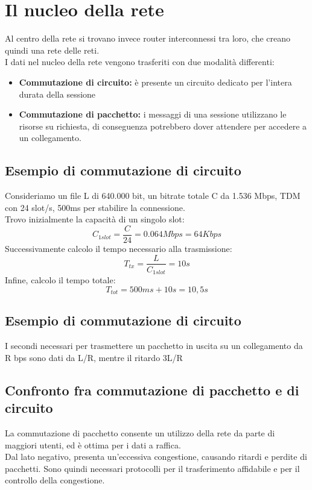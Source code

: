 \documentclass{report}
\begin{document}
	\section{Il nucleo della rete}
	Al centro della rete si trovano invece router interconnessi tra loro, che creano quindi una rete delle reti.
	\medskip\\I dati nel nucleo della rete vengono trasferiti con due modalità differenti:
	\begin{itemize}
		\item \textbf{Commutazione di circuito:} è presente un circuito dedicato per l'intera durata della sessione
		\item \textbf{Commutazione di pacchetto:} i messaggi di una sessione utilizzano le risorse su richiesta, di conseguenza potrebbero dover attendere per accedere a un collegamento.
	\end{itemize}
	\subsection{Esempio di commutazione di circuito}
	Consideriamo un file L di 640.000 bit, un bitrate totale C da 1.536 Mbps, TDM con 24 slot/s, 500ms per stabilire la connessione.
	\medskip\\ Trovo inizialmente la capacità di un singolo slot:\[C_{1 slot} = \frac{C}{24} = 0.064 Mbps = 64 Kbps\]
	Successivamente calcolo il tempo necessario alla trasmissione:\[T_{tx} = \frac{L}{C_{1 slot}} = 10s\]
	Infine, calcolo il tempo totale:\[T_{tot}=500ms+10s=10,5s\]
	\subsection{Esempio di commutazione di circuito}
	I secondi necessari per trasmettere un pacchetto in uscita su un collegamento da R bps sono dati da L/R, mentre il ritardo 3L/R
	\subsection{Confronto fra commutazione di pacchetto e di circuito}
	La commutazione di pacchetto consente un utilizzo della rete da parte di maggiori utenti, ed è ottima per i dati a raffica.\medskip\\ Dal lato negativo, presenta un'eccessiva congestione, causando ritardi e perdite di pacchetti. Sono quindi necessari protocolli per il trasferimento affidabile e per il controllo della congestione.
\end{document}
